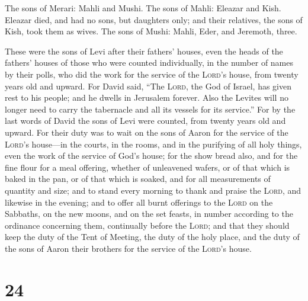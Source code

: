  The sons of Merari: Mahli and Mushi. The sons of Mahli:
Eleazar and Kish.  Eleazar died, and had no sons, but
daughters only; and their relatives, the sons of Kish, took them as
wives.  The sons of Mushi: Mahli, Eder, and Jeremoth,
three.

 These were the sons of Levi after their fathers' houses,
even the heads of the fathers' houses of those who were counted
individually, in the number of names by their polls, who did the work
for the service of the \textsc{Lord}'s house, from twenty years old and
upward.  For David said, ``The \textsc{Lord}, the God of
Israel, has given rest to his people; and he dwells in Jerusalem
forever.  Also the Levites will no longer need to carry
the tabernacle and all its vessels for its service.'' 
For by the last words of David the sons of Levi were counted, from
twenty years old and upward.  For their duty was to wait
on the sons of Aaron for the service of the \textsc{Lord}'s house---in
the courts, in the rooms, and in the purifying of all holy things, even
the work of the service of God's house;  for the show
bread also, and for the fine flour for a meal offering, whether of
unleavened wafers, or of that which is baked in the pan, or of that
which is soaked, and for all measurements of quantity and size;
 and to stand every morning to thank and praise the
\textsc{Lord}, and likewise in the evening;  and to offer
all burnt offerings to the \textsc{Lord} on the Sabbaths, on the new
moons, and on the set feasts, in number according to the ordinance
concerning them, continually before the \textsc{Lord}; 
and that they should keep the duty of the Tent of Meeting, the duty of
the holy place, and the duty of the sons of Aaron their brothers for the
service of the \textsc{Lord}'s house.

\hypertarget{section-23}{%
\section{24}\label{section-23}}

